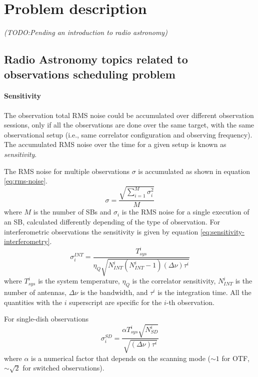 \chapter{Problem description}

\textit{(TODO:Pending an introduction to radio astronomy)}
\section{Radio Astronomy topics related to observations scheduling problem}
\subsubsection{Sensitivity}
\label{sec:sens}
The observation total RMS noise could be accumulated over different observation sessions, only if all the observations are done over the same target, with the same observational setup (i.e., same correlator configuration and observing frequency). The accumulated RMS noise over the time for a given setup is known as \textit{sensitivity}.

The RMS noise for multiple observations $\sigma$ is accumulated as shown in equation \ref{eq:rms-noise}.
\begin{equation}
\label{eq:rms-noise}
\sigma = \frac{\sqrt{\sum_{i=1}^M \sigma_i^2}}{M}
\end{equation}
where $M$ is the number of SBs and $\sigma_i$ is the RMS noise for a single
execution of an SB, calculated differently depending of the type of observation.
For interferometric observations the sensitivity is given by equation \ref{eq:sensitivity-interferometry}.
\begin{equation}
\label{eq:sensitivity-interferometry}
\sigma_i^{INT} = \frac{T_{sys}^i}{\eta_Q \sqrt{N_{INT}^i(N_{INT}^i-1)(\Delta\nu)\tau^i}}
\end{equation}
where $T_{sys}^i$ is the system temperature, $\eta_Q$ is the correlator sensitivity,
$N_{INT}^i$ is the number of antennas, $\Delta\nu$ is the bandwidth, and $\tau^i$ is
the integration time. All the quantities with the $i$ superscript are specific for the $i$-th
observation.

For single-dish observations
\begin{equation}
\sigma_i^{SD} = \frac{\alpha T_{sys}^i \sqrt{N_{SD}^i}}{\sqrt{(\Delta\nu)\tau^i}}
\end{equation}
where $\alpha$ is a numerical factor that depends on the scanning mode ($\sim 1$ for OTF,
$\sim \sqrt{2}$ for switched observations).

